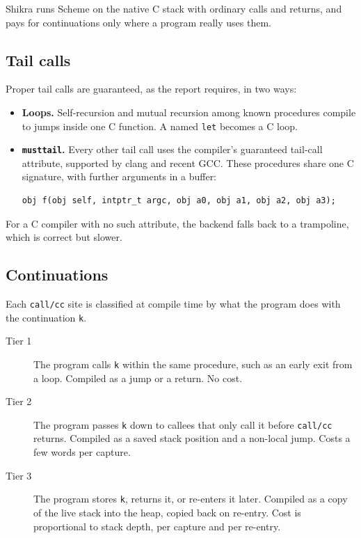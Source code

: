 \documentclass[a4paper,11pt]{article}
\begin{document}
Shikra runs Scheme on the native C stack with ordinary calls and returns,
and pays for continuations only where a program really uses them.

\subsection{Tail calls}

Proper tail calls are guaranteed, as the report requires, in two ways:

\begin{itemize}
\item \textbf{Loops.} Self-recursion and mutual recursion among known
  procedures compile to jumps inside one C function. A named \texttt{let}
  becomes a C loop.
\item \textbf{\texttt{musttail}.} Every other tail call uses the compiler's
  guaranteed tail-call attribute, supported by clang and recent GCC. These
  procedures share one C signature, with further arguments in a buffer:
\begin{verbatim}
obj f(obj self, intptr_t argc, obj a0, obj a1, obj a2, obj a3);
\end{verbatim}
\end{itemize}

For a C compiler with no such attribute, the backend falls back to a
trampoline, which is correct but slower.

\subsection{Continuations}

Each \texttt{call/cc} site is classified at compile time by what the program
does with the continuation \texttt{k}.

\begin{description}
\item[Tier 1] The program calls \texttt{k} within the same procedure, such
  as an early exit from a loop. Compiled as a jump or a return. No cost.
\item[Tier 2] The program passes \texttt{k} down to callees that only call
  it before \texttt{call/cc} returns. Compiled as a saved stack position and
  a non-local jump. Costs a few words per capture.
\item[Tier 3] The program stores \texttt{k}, returns it, or re-enters it
  later. Compiled as a copy of the live stack into the heap, copied back on
  re-entry. Cost is proportional to stack depth, per capture and per
  re-entry.
\end{description}
\end{document}
